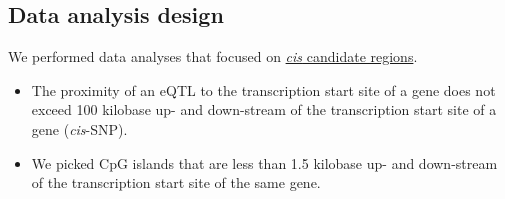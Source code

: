 \documentclass[hidelinks]{article}
\begin{document}
\begin{table}[H]
\begin{center}
\label{table:design}
\end{center}
\caption{\emph{A description of brain data}}
\end{table}

\subsection{Data analysis design}
We performed data analyses that focused on \underline{\emph{cis} candidate regions}. 
\begin{itemize}
\item The proximity of an eQTL to the transcription start site of a gene does not exceed 100 kilobase up- and down-stream of the transcription start site of a gene (\emph{cis}-SNP). 
\item We picked CpG islands that are less than 1.5 kilobase up- and down-stream of the transcription start site of the same gene.
\end{itemize}
\end{document}
